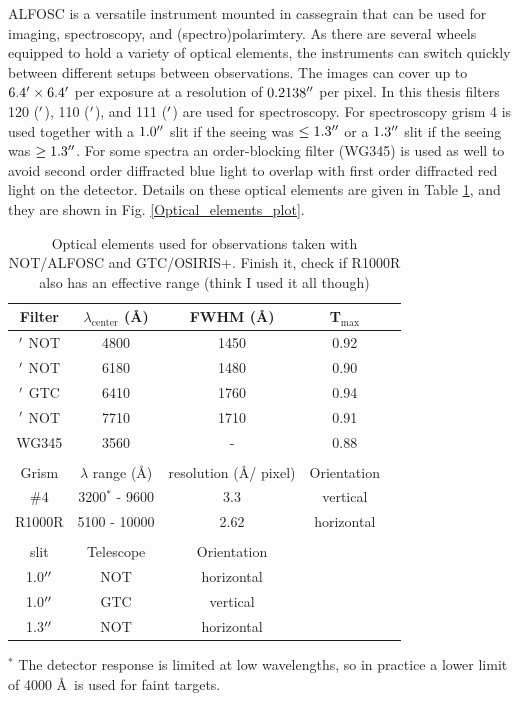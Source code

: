 \documentclass[a4paper,oneside,12pt, class=Latex/Classes/PhDthesisPSnPDF, crop=false]{standalone}
\begin{document}
ALFOSC is a versatile instrument mounted in cassegrain that can be used for imaging, spectroscopy, and (spectro)polarimtery. As there are several wheels equipped to hold a variety of optical elements, the instruments can switch quickly between different setups between observations. The images can cover up to $6.4^{\prime}\times6.4^{\prime}$ per exposure at a resolution of $0.2138^{\prime\prime}$ per pixel. In this thesis filters 120 (\ztfg$^{\prime}$), 110 (\ztfr$^{\prime}$), and 111 (\ztfi$^{\prime}$) are used for spectroscopy. For spectroscopy grism 4 is used together with a $1.0^{\prime\prime}$ slit if the seeing was $\leq1.3^{\prime\prime}$ or a  $1.3^{\prime\prime}$ slit if the seeing was $\geq1.3^{\prime\prime}$. For some spectra an order-blocking filter (WG345) is used as well to avoid second order diffracted blue light to overlap with first order diffracted red light on the detector. Details on these optical elements are given in Table \ref{NOT_optic_elems}, and they are shown in Fig. \ref{Optical_elements_plot}.

\begin{table}
    \centering
    \caption{Optical elements used for observations taken with NOT/ALFOSC and GTC/OSIRIS+. \color{red}Finish it, check if R1000R also has an effective range (think I used it all though)\color{black}}
    	\begin{tabular}{ccccc}
    		\hline
    		\hline
    		Filter & $\lambda_\text{center}$ (\AA) & FWHM (\AA) & T$_\text{max}$\\
    		\hline
    		\ztfg$^{\prime}$ NOT & 4800 & 1450 & 0.92\\
    		\ztfr$^{\prime}$ NOT & 6180 & 1480 & 0.90\\
    		\ztfr$^{\prime}$ GTC & 6410 & 1760 & 0.94\\
    		\ztfi$^{\prime}$ NOT & 7710 & 1710 & 0.91\\
    		WG345 & 3560 & - & 0.88\\
    		\\
    		\hline
    		\hline
    		Grism & $\lambda$ range (\AA) & resolution (\AA / pixel) & Orientation\\
    		\hline
    		\#4 & 3200$^*$ - 9600 & 3.3 & vertical\\
    		R1000R & 5100 - 10000 & 2.62 & horizontal\\
    		\\
    		\hline
    		\hline
    		slit & Telescope & Orientation\\
    		\hline
    		1.0$^{\prime\prime}$ & NOT & horizontal & \\
    		1.0$^{\prime\prime}$ & GTC & vertical & \\
    		1.3$^{\prime\prime}$ & NOT & horizontal & \\
    		\hline
    	\end{tabular}
    \begin{flushleft}
    	$^*$ The detector response is limited at low wavelengths, so in practice a lower limit of 4000 \AA\ is used for faint targets.
    \end{flushleft}
    \label{NOT_optic_elems}
\end{table}
\end{document}
